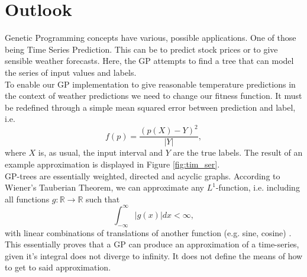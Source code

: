 \documentclass[11pt,a4paper]{article}
\begin{document}
\section*{Outlook}
Genetic Programming concepts have various, possible applications. One of those being Time Series Prediction. This can be to predict stock prices or to give sensible weather forecasts. Here, the GP attempts to find a tree that can model the series of input values and labels. \\
To enable our GP implementation to give reasonable temperature predictions in the context of weather predictions we need to change our fitness function. It must be redefined through a simple mean squared error between prediction and label, i.e.
\[
f(p)= \frac{(p(X)-Y)^2}{|Y|},
\]
where $X$ is, as usual, the input interval and $Y$ are the true labels. The result of an example approximation is displayed in Figure \ref{fig:tim_ser}.\\
GP-trees are essentially weighted, directed and acyclic graphs. According to Wiener's Tauberian Theorem, we can approximate any $L^1$-function, i.e. including all functions $g: \mathbb{R} \rightarrow \mathbb{R}$ such that 
\[
\int_{-\infty}^{\infty} |g(x)|dx < \infty,
\]
with linear combinations of translations of another function (e.g. sine, cosine) \citep{Taub}. This essentially proves that a GP can produce an approximation of a time-series, given it's integral does not diverge to infinity. It does not define the means of how to get to said approximation.
\end{document}
